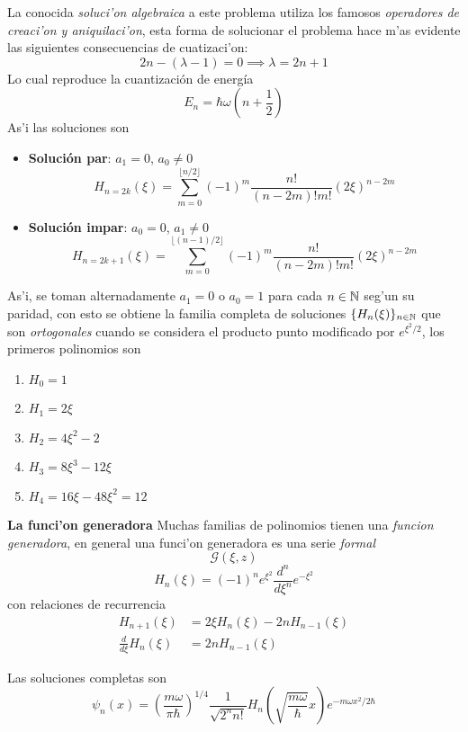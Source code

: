 \documentclass[main.tex]{subfiles}
\begin{document}
La conocida \emph{soluci'on algebraica} a este problema utiliza los famosos \emph{operadores de creaci'on y aniquilaci'on}, esta forma de solucionar el problema hace m'as evidente las siguientes consecuencias de cuatizaci'on:
\[
2n - (\lambda - 1) = 0 \implies \lambda = 2n + 1
\]
Lo cual reproduce la cuantización de energía
\[
E_n = \hbar\omega\left(n + \frac{1}{2}\right)
\]
As'i las soluciones son
\begin{itemize}
\item \textbf{Solución par}: \(a_1 = 0\), \(a_0 \neq 0\)
\[
H_{n=2k}(\xi) = \sum_{m=0}^{\lfloor n/2 \rfloor} (-1)^m \frac{n!}{(n-2m)!m!} (2\xi)^{n-2m}
\]

\item \textbf{Solución impar}: \(a_0 = 0\), \(a_1 \neq 0\)
\[
H_{n=2k+1}(\xi) = \sum_{m=0}^{\lfloor (n-1)/2 \rfloor} (-1)^m \frac{n!}{(n-2m)!m!} (2\xi)^{n-2m}
\]
\end{itemize}
As'i, se toman alternadamente $a_{1}=0$ o $a_{0}=1$ para cada $n\in \mathbb N $ seg'un su paridad, con esto se obtiene la familia completa de soluciones $\{H_{n}(\xi)\}_{n\in \mathbb N }$ que son \emph{ortogonales} cuando se considera el producto punto modificado por $e^{\xi^{2}/2}$, los primeros polinomios son
\begin{enumerate}
  \item $H_{0}=1$
  \item $H_{1}=2\xi$
  \item $H_{2}=4\xi^{2}-2$
  \item $H_{3}=8\xi^{3}-12\xi$
  \item $H_{4}=16\xi-48\xi^2=12$
\end{enumerate}
\noindent\textbf{La funci'on generadora}
Muchas familias de polinomios tienen una \emph{funcion generadora}, en general una funci'on generadora es una serie \emph{formal}
\[
  \mathcal{G}(\xi,z)
\]
\begin{equation}
H_n(\xi) = (-1)^n e^{\xi^2}\frac{d^n}{d\xi^n}e^{-\xi^2}
\end{equation}
con relaciones de recurrencia
\begin{align}
H_{n+1}(\xi) &= 2\xi H_n(\xi) - 2n H_{n-1}(\xi) \\
\frac{d}{d\xi}H_n(\xi) &= 2n H_{n-1}(\xi)
\end{align}

Las soluciones completas son
\begin{equation}
\psi_n(x) = \left(\frac{m\omega}{\pi\hbar}\right)^{1/4}\frac{1}{\sqrt{2^n n!}}H_n\left(\sqrt{\frac{m\omega}{\hbar}}x\right)e^{-m\omega x^2/2\hbar}
\end{equation}
\end{document}
